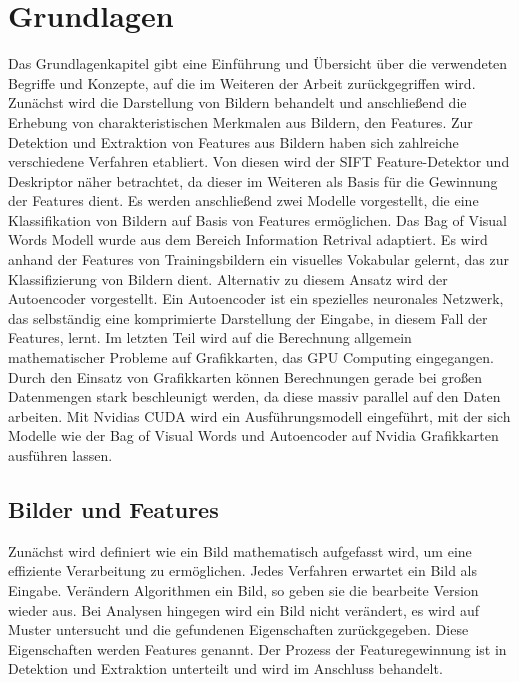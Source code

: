 \chapter{Grundlagen}

Das Grundlagenkapitel gibt eine Einführung und Übersicht über die verwendeten Begriffe und Konzepte, auf die im Weiteren der Arbeit zurückgegriffen wird. Zunächst wird die Darstellung von Bildern behandelt und anschließend die Erhebung von charakteristischen Merkmalen aus Bildern, den Features. Zur Detektion und Extraktion von Features aus Bildern haben sich zahlreiche verschiedene Verfahren etabliert. Von diesen wird der SIFT Feature-Detektor und Deskriptor näher betrachtet, da dieser im Weiteren als Basis für die Gewinnung der Features dient. 
Es werden anschließend zwei Modelle vorgestellt, die eine Klassifikation von Bildern auf Basis von Features ermöglichen. Das Bag of Visual Words Modell wurde aus dem Bereich Information Retrival adaptiert. Es wird anhand der Features von Trainingsbildern ein visuelles Vokabular gelernt, das zur Klassifizierung von Bildern dient. Alternativ zu diesem Ansatz wird der Autoencoder vorgestellt. Ein Autoencoder ist ein spezielles neuronales Netzwerk, das selbständig eine komprimierte Darstellung der Eingabe, in diesem Fall der Features, lernt. 
Im letzten Teil wird auf die Berechnung allgemein mathematischer Probleme auf Grafikkarten, das GPU Computing eingegangen. Durch den Einsatz von Grafikkarten können Berechnungen gerade bei großen Datenmengen stark beschleunigt werden, da diese massiv parallel auf den Daten arbeiten. Mit Nvidias CUDA wird ein Ausführungsmodell eingeführt, mit der sich Modelle wie der Bag of Visual Words und Autoencoder auf Nvidia Grafikkarten ausführen lassen.

\section{Bilder und Features}

Zunächst wird definiert wie ein Bild mathematisch aufgefasst wird, um eine effiziente Verarbeitung zu ermöglichen. Jedes Verfahren erwartet ein Bild als Eingabe. Verändern Algorithmen ein Bild, so geben sie die bearbeite Version wieder aus. Bei Analysen hingegen wird ein Bild nicht verändert, es wird auf Muster untersucht und die gefundenen Eigenschaften zurückgegeben. Diese Eigenschaften werden Features genannt. Der Prozess der Featuregewinnung ist in Detektion und Extraktion unterteilt und wird im Anschluss behandelt.

